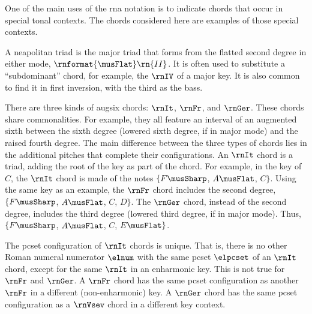 
One of the main uses of the \gls{rna} notation is to
indicate chords that occur in special tonal contexts. The
chords considered here are examples of those special
contexts.


A \gls{neapolitan} triad is the major triad that forms from
the flatted second degree in either mode,
$\rnformat{\musFlat}\rn{II}$. It is often used to substitute
a ``subdominant'' chord, for example, the $\rnIV$ of a major
key. It is also common to find it in first inversion, with
the third as the bass.


There are three kinds of \gls{augsix} chords: $\rnIt$,
$\rnFr$, and $\rnGer$. These chords share commonalities. For
example, they all feature an interval of an augmented sixth
between the sixth degree (lowered sixth degree, if in major
mode) and the raised fourth degree. The main difference
between the three types of chords lies in the additional
pitches that complete their configurations. An $\rnIt$ chord
is a triad, adding the root of the key as part of the chord.
For example, in the key of $C$, the $\rnIt$ chord is made of
the notes $\{F\musSharp$, $A\musFlat$, $C\}$. Using the same
key as an example, the $\rnFr$ chord includes the second
degree, $\{F\musSharp$, $A\musFlat$, $C$, $D\}$. The
$\rnGer$ chord, instead of the second degree, includes the
third degree (lowered third degree, if in major mode). Thus,
$\{F\musSharp$, $A\musFlat$, $C$, $E\musFlat\}$.

The \gls{pcset} configuration of $\rnIt$ chords is unique.
That is, there is no other Roman numeral numerator $\elnum$
with the same \gls{pcset} $\elpcset$ of an $\rnIt$ chord,
except for the same $\rnIt$ in an enharmonic key. This is
not true for $\rnFr$ and $\rnGer$. A $\rnFr$ chord has the
same \gls{pcset} configuration as another $\rnFr$ in a
different (non-enharmonic) key. A $\rnGer$ chord has the
same \gls{pcset} configuration as a $\rnVsev$ chord in a
different key context.
